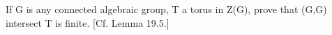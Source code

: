 If G is any connected algebraic group, T a torus in Z(G), prove that (G,G) intersect T is finite. [Cf. Lemma 19.5.]
